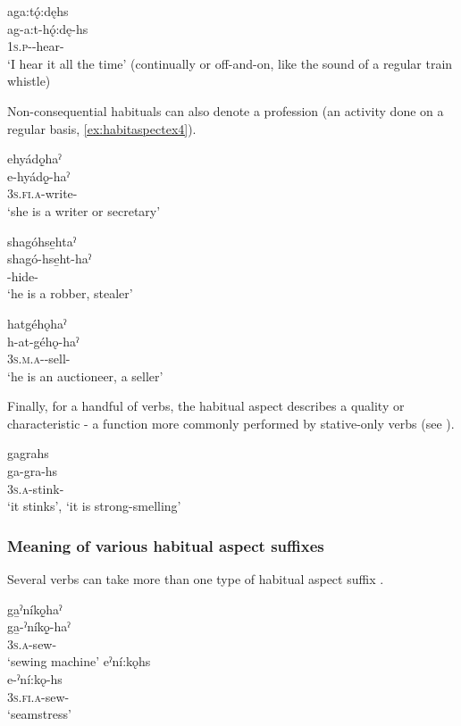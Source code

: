 \ex aga:tǫ́:dęhs\\
\gll ag-a:t-hǫ́:dę-hs\\
\textsc{1s.p}-{\semireflexive}-hear-{\habitual}\\
\glt ‘I hear it all the time’ (continually or off-and-on, like the sound of a regular train whistle)
\z
\z

Non-consequential habituals can also denote a profession (an activity done on a regular basis, \ref{ex:habitaspectex4}).

\ea\label{ex:habitaspectex4}
\ea ehyádǫ̱haˀ\\
\gll e-hyádǫ̱-haˀ\\
 \textsc{3s.fi.a}-write-{\habitual}\\
\glt `she is a writer or secretary'

\ex shagóhse̱htaˀ\\
\gll shagó-hse̱ht-haˀ\\
 -hide-{\habitual}\\
\glt `he is a robber, stealer'

\ex hatgéhǫhaˀ\\
\gll h-at-géhǫ-haˀ\\
 \textsc{3s.m.a}-{\semireflexive}-sell-{\habitual}\\
\glt `he is an auctioneer, a seller'
\z
\z

Finally, for a handful of verbs, the habitual aspect describes a quality or characteristic  - a function more commonly performed by stative-only verbs (see ).

\ea\label{ex:habitaspectex6} gagrahs\\
\gll ga-gra-hs \\
\textsc{3s.a}-stink-{\habitual}\\
\glt ‘it stinks’, ‘it is strong-smelling’ 
\z


\subsubsection{Meaning of various habitual aspect suffixes}
Several verbs can take more than one type of habitual aspect suffix . 

\ea\label{ex:morehabitualex1}
\ea ga̱ˀníkǫ̱haˀ\\
\gll ga̱-ˀníkǫ̱-haˀ\\
 \textsc{3s.a}-sew-{\habitual}\\
\glt `sewing machine'
\ex eˀní:kǫhs\\
\gll e-ˀní:kǫ-hs\\
 \textsc{3s.fi.a}-sew-{\habitual}\\
\glt `seamstress'
\z
\z

